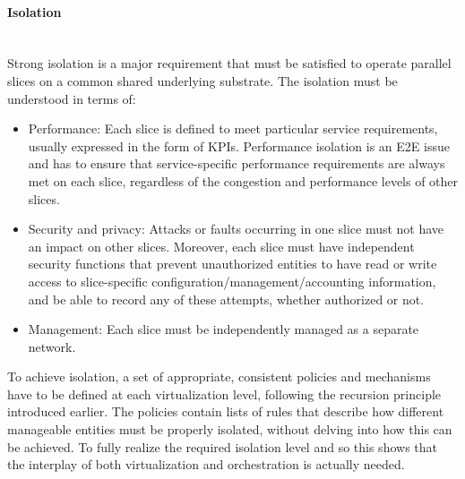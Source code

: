 \documentclass{report}
\begin{document}
\paragraph{Isolation}\mbox{}\\
Strong isolation is a major requirement that must
be satisfied to operate parallel slices on a common shared underlying substrate. The isolation
must be understood in terms of:
\begin{itemize}
\item Performance: Each slice is defined to meet particular service requirements, usually expressed in the
form of \gls{KPI}s. Performance isolation is an E2E issue and has to ensure
that service-specific performance requirements are
always met on each slice, regardless of the congestion and performance levels of other slices.
\end{itemize}
\begin{itemize}
\item Security and privacy: Attacks or faults occurring in one slice must not have an impact on
other slices. Moreover, each slice must have
independent security functions that prevent unauthorized entities to have read or write access to
slice-specific configuration/management/accounting information, and be able to record any of
these attempts, whether authorized or not.
\end{itemize}
\begin{itemize}
\item Management: Each slice must be independently managed as a separate network.
\end{itemize}
To achieve isolation, a set of appropriate, consistent policies and mechanisms have to be defined
at each virtualization level, following the recursion
principle introduced earlier. The policies contain lists of rules that describe how different manageable entities must be properly isolated, without delving into how this can be achieved.
To fully realize the
required isolation level and so this shows that the interplay of both virtualization and orchestration is actually needed.
\end{document}
